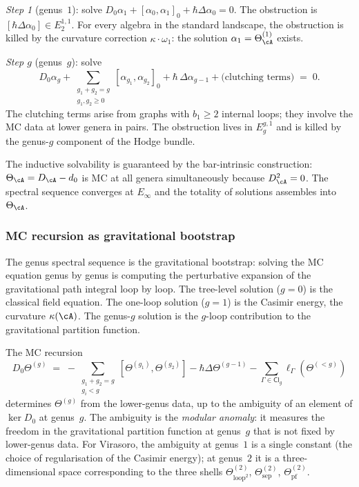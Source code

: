 \smallskip\noindent
\emph{Step 1} (genus~$1$): solve
$D_0\alpha_1+[\alpha_0,\alpha_1]_0+\hbar\Delta\alpha_0=0$. The
obstruction is
$[\hbar\Delta\alpha_0]\in E_2^{1,1}$. For every algebra
in the standard landscape, the obstruction is killed by the
curvature correction $\kappa\cdot\omega_1$: the solution
$\alpha_1=\Theta_\cA^{(1)}$ exists.

\smallskip\noindent
\emph{Step $g$} (genus~$g$): solve
\[
D_0\alpha_g
+\sum_{\substack{g_1+g_2=g\\g_1,g_2\ge 0}}
[\alpha_{g_1},\alpha_{g_2}]_0
+\hbar\,\Delta\alpha_{g-1}
+\text{(clutching terms)}
\;=\;0.
\]
The clutching terms arise from graphs with $b_1\ge 2$ internal
loops; they involve the MC data at lower genera in pairs. The
obstruction lives in $E_g^{g,1}$ and is killed by the
genus-$g$ component of the Hodge bundle.

The inductive solvability is guaranteed by the bar-intrinsic
construction: $\Theta_\cA=D_\cA-d_0$ is MC at all genera
simultaneously because $D_\cA^2=0$. The spectral sequence
converges at $E_\infty$ and the totality of solutions assembles
into $\Theta_\cA$.

\subsubsection*{MC recursion as gravitational bootstrap}

The genus spectral sequence is the gravitational bootstrap:
solving the MC equation genus by genus is computing the
perturbative expansion of the gravitational path integral loop
by loop. The tree-level solution ($g=0$) is the classical
field equation. The one-loop solution ($g=1$) is the Casimir
energy, the curvature $\kappa(\cA)$. The genus-$g$ solution
is the $g$-loop contribution to the gravitational partition
function.

The MC recursion
\[
D_0\Theta^{(g)}
\;=\;
-\sum_{\substack{g_1+g_2=g\\g_i<g}}
[\Theta^{(g_1)},\Theta^{(g_2)}]
-\hbar\Delta\Theta^{(g-1)}
-\sum_{\Gamma\in\mathsf{Cl}_g}
\ell_\Gamma(\Theta^{(<g)})
\]
determines $\Theta^{(g)}$ from the lower-genus data, up to
the ambiguity of an element of $\ker D_0$ at genus~$g$. The
ambiguity is the \emph{modular anomaly}: it measures the freedom
in the gravitational partition function at genus~$g$ that is not
fixed by lower-genus data. For Virasoro, the ambiguity at
genus~$1$ is a single constant (the choice of regularisation of
the Casimir energy); at genus~$2$ it is a three-dimensional
space corresponding to the three shells
$\Theta^{(2)}_{\mathrm{loop}^2}$,
$\Theta^{(2)}_{\mathrm{sep}}$,
$\Theta^{(2)}_{\mathrm{pf}}$.

